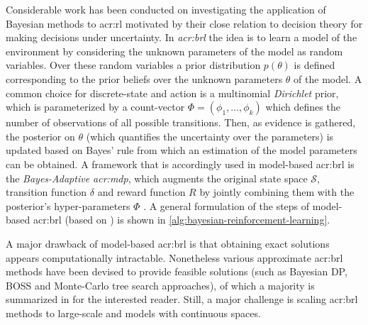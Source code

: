 Considerable work has been conducted on investigating the application of Bayesian methods to \acrshort{acr:rl} motivated by their close relation to decision theory for making decisions under uncertainty. 
In \textit{\acrfull{acr:brl}} the idea is to learn a model of the environment by considering the unknown parameters of the model as random variables.
Over these random variables a prior distribution $p(\theta)$ is defined corresponding to the prior beliefs over the unknown parameters $\theta$ of the model.
A common choice for discrete-state and action  is a multinomial \textit{Dirichlet} prior, which is parameterized by a count-vector $\Phi = (\phi_1, \ldots, \phi_k)$ which defines the number of observations of all possible transitions.
Then, as evidence is gathered, the posterior on $\theta$ (which quantifies the uncertainty over the parameters) is updated based on Bayes' rule from which an estimation of the model parameters can be obtained.
A framework that is accordingly used in model-based \acrshort{acr:brl} is the \textit{Bayes-Adaptive \acrshort{acr:mdp}}, which augments the original state space $\mathcal{S}$, transition function $\delta$ and reward function $R$ by jointly combining them with the posterior's hyper-parameters $\Phi$ \cite{guez2012efficient}.
A general formulation of the steps of model-based \acrshort{acr:brl} (based on \cite{png2011bayesian}) is shown in \autoref{alg:bayesian-reinforcement-learning}.

A major drawback of model-based \acrshort{acr:brl} is that obtaining exact solutions appears computationally intractable.
Nonetheless various approximate \acrshort{acr:brl} methods have been devised to provide feasible solutions (such as Bayesian DP, BOSS and Monte-Carlo tree search approaches), of which a majority is summarized in \cite{ghavamzadeh2015bayesian} for the interested reader.
Still, a major challenge is scaling \acrshort{acr:brl} methods to large-scale  and models with continuous spaces.


